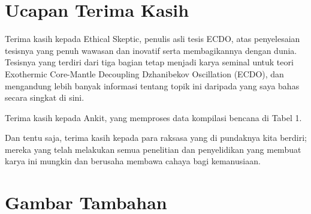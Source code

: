 \documentclass[10pt,twocolumn,letterpaper]{article}
\begin{document}
\section{Ucapan Terima Kasih}

Terima kasih kepada Ethical Skeptic, penulis asli tesis ECDO, atas penyelesaian tesisnya yang penuh wawasan dan inovatif serta membagikannya dengan dunia. Tesisnya yang terdiri dari tiga bagian \cite{1} tetap menjadi karya seminal untuk teori Exothermic Core-Mantle Decoupling Dzhanibekov Oscillation (ECDO), dan mengandung lebih banyak informasi tentang topik ini daripada yang saya bahas secara singkat di sini.

Terima kasih kepada Ankit, yang memproses data kompilasi bencana di Tabel 1.

Dan tentu saja, terima kasih kepada para raksasa yang di pundaknya kita berdiri; mereka yang telah melakukan semua penelitian dan penyelidikan yang membuat karya ini mungkin dan berusaha membawa cahaya bagi kemanusiaan.

\clearpage
\twocolumn

\section{Gambar Tambahan}
\end{document}
